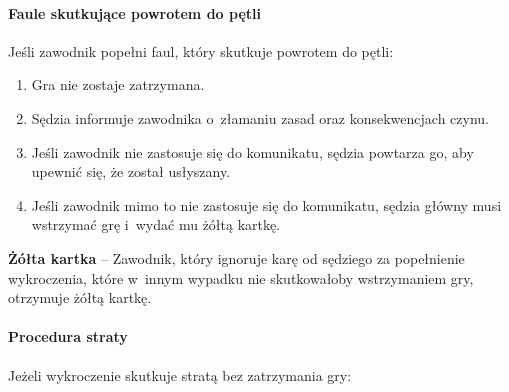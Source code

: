 \documentclass[12pt,a4paper]{article}
\newcommand\yellowcard[1]{\bgroup\textcolor{darkyellow}{\textbf{#1}}}
\begin{document}
\paragraph{Faule skutkujące powrotem do pętli}
Jeśli zawodnik
popełni faul, który skutkuje powrotem do pętli:

\begin{enumerate}
	\item
	      Gra nie zostaje zatrzymana.
	\item
	      Sędzia informuje zawodnika o~złamaniu zasad oraz konsekwencjach czynu.
	\item
	      Jeśli zawodnik nie zastosuje się do komunikatu, sędzia powtarza go,
	      aby upewnić się, że został usłyszany.
	\item
	      Jeśli zawodnik mimo to nie zastosuje się do komunikatu, sędzia główny
	      musi wstrzymać grę i~wydać mu żółtą kartkę.
\end{enumerate}

\yellowcard{Żółta kartka} -- Zawodnik, który ignoruje karę od sędziego za
popełnienie wykroczenia, które w~innym wypadku nie skutkowałoby
wstrzymaniem gry, otrzymuje żółtą kartkę.

\paragraph{Procedura straty}
Jeżeli wykroczenie skutkuje stratą
bez zatrzymania gry:
\end{document}
